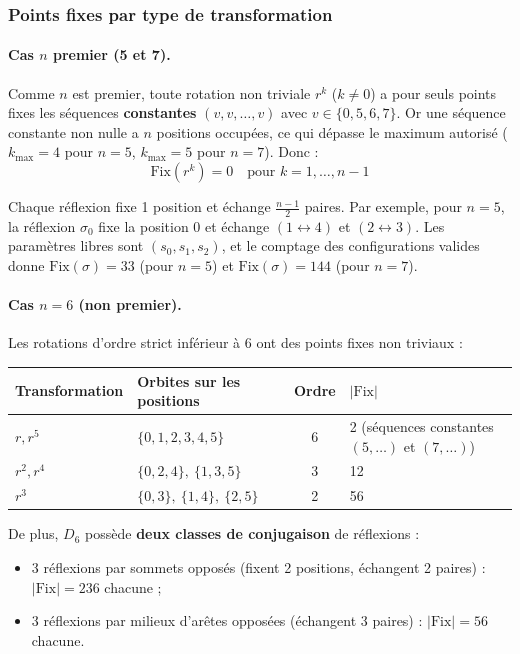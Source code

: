\documentclass[a4paper,12pt]{article}
\begin{document}
\subsubsection{Points fixes par type de transformation}

\paragraph{Cas $n$ premier (5 et 7).}
Comme $n$ est premier, toute rotation non triviale $r^k$ ($k \neq 0$) a pour seuls points
fixes les séquences \textbf{constantes} $(v, v, \ldots, v)$ avec $v \in \{0,5,6,7\}$.
Or une séquence constante non nulle a $n$ positions occupées, ce qui dépasse le maximum autorisé
($k_{\max} = 4$ pour $n=5$, $k_{\max} = 5$ pour $n=7$). Donc :
\[
  \text{Fix}(r^k) = 0 \quad \text{pour } k = 1, \ldots, n-1
\]

Chaque réflexion fixe 1 position et échange $\frac{n-1}{2}$ paires. Par exemple, pour $n=5$,
la réflexion $\sigma_0$ fixe la position 0 et échange $(1 \leftrightarrow 4)$ et
$(2 \leftrightarrow 3)$. Les paramètres libres sont $(s_0, s_1, s_2)$, et le comptage des
configurations valides donne $\text{Fix}(\sigma) = 33$ (pour $n=5$) et $\text{Fix}(\sigma) = 144$
(pour $n=7$).

\paragraph{Cas $n = 6$ (non premier).}
Les rotations d'ordre strict inférieur à 6 ont des points fixes non triviaux :

\begin{center}
\begin{tabular}{llcl}
  \toprule
  Transformation & Orbites sur les positions & Ordre & $|\text{Fix}|$ \\
  \midrule
  $r, r^5$   & $\{0,1,2,3,4,5\}$ & 6 & 2 (séquences constantes $(5,\ldots)$ et $(7,\ldots)$) \\
  $r^2, r^4$ & $\{0,2,4\},\ \{1,3,5\}$ & 3 & 12 \\
  $r^3$      & $\{0,3\},\ \{1,4\},\ \{2,5\}$ & 2 & 56 \\
  \bottomrule
\end{tabular}
\end{center}

De plus, $D_6$ possède \textbf{deux classes de conjugaison} de réflexions :
\begin{itemize}
  \item 3 réflexions par sommets opposés (fixent 2 positions, échangent 2 paires) :
    $|\text{Fix}| = 236$ chacune ;
  \item 3 réflexions par milieux d'arêtes opposées (échangent 3 paires) :
    $|\text{Fix}| = 56$ chacune.
\end{itemize}
\end{document}
